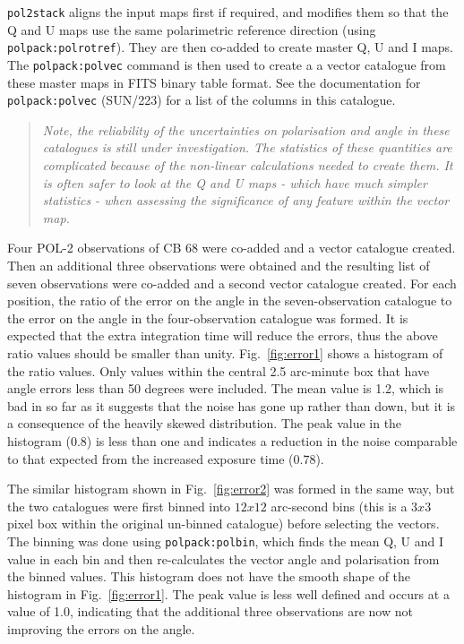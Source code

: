 \documentclass[twoside,11pt]{starlink}
\begin{document}
\texttt{pol2stack} aligns the input maps first if required, and modifies
them so that the Q and U maps use the same polarimetric reference
direction (using \texttt{polpack:polrotref}). They are then co-added to
create master Q, U and I maps. The \texttt{polpack:polvec} command is
then used to create a a vector catalogue from these master maps in FITS
binary table format. See the documentation for \texttt{polpack:polvec}
(SUN/223) for a list of the columns in this catalogue.

\begin{quote}
\emph{Note, the reliability of the uncertainties on polarisation and angle
in these catalogues is still under investigation. The statistics of these
quantities are complicated because of the non-linear calculations needed
to create them. It is often safer to look at the Q and U maps - which
have much simpler statistics - when assessing the significance of any
feature within the vector map.}
\end{quote}

Four POL-2 observations of CB 68 were co-added and a vector catalogue
created. Then an additional three observations were obtained and the
resulting list of seven observations were co-added and a second vector
catalogue created. For each position, the ratio of the error on the angle
in the seven-observation catalogue to the error on the angle in the
four-observation catalogue was formed. It is expected that the extra
integration time will reduce the errors, thus the above ratio values
should be smaller than unity. Fig.~\ref{fig:error1} shows a histogram of
the ratio values. Only values within the central 2.5 arc-minute box that
have angle errors less than 50 degrees were included. The mean value is
1.2, which is bad in so far as it suggests that the noise has gone up
rather than down, but it is a consequence of the heavily skewed
distribution. The peak value in the histogram (0.8) is less than one and
indicates a reduction in the noise comparable to that expected from the
increased exposure time (0.78).

The similar histogram shown in Fig.~\ref{fig:error2} was formed in the
same way, but the two catalogues were first binned into $12x12$
arc-second bins (this is a $3x3$ pixel box within the original un-binned
catalogue) before selecting the vectors. The binning was done using
\texttt{polpack:polbin}, which finds the mean Q, U and I value in each
bin and then re-calculates the vector angle and polarisation from the
binned values. This histogram does not have the smooth shape of the
histogram in Fig.~\ref{fig:error1}. The peak value is less well defined
and occurs at a value of 1.0, indicating that the additional three observations
are now not improving the errors on the angle.
\end{document}
